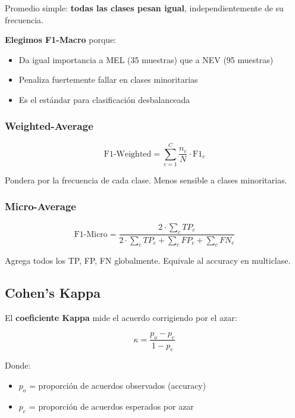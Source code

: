 \documentclass[12pt,a4paper]{article}
\begin{document}
Promedio simple: \textbf{todas las clases pesan igual}, independientemente de su frecuencia.

\textbf{Elegimos F1-Macro} porque:
\begin{itemize}
    \item Da igual importancia a MEL (35 muestras) que a NEV (95 muestras)
    \item Penaliza fuertemente fallar en clases minoritarias
    \item Es el estándar para clasificación desbalanceada
\end{itemize}

\subsubsection{Weighted-Average}

\begin{equation}
\text{F1-Weighted} = \sum_{c=1}^{C} \frac{n_c}{N} \cdot \text{F1}_c
\end{equation}

Pondera por la frecuencia de cada clase. Menos sensible a clases minoritarias.

\subsubsection{Micro-Average}

\begin{equation}
\text{F1-Micro} = \frac{2 \cdot \sum_c TP_c}{2 \cdot \sum_c TP_c + \sum_c FP_c + \sum_c FN_c}
\end{equation}

Agrega todos los TP, FP, FN globalmente. Equivale al accuracy en multiclase.

\subsection{Cohen's Kappa}

El \textbf{coeficiente Kappa} mide el acuerdo corrigiendo por el azar:

\begin{equation}
\kappa = \frac{p_o - p_e}{1 - p_e}
\end{equation}

Donde:
\begin{itemize}
    \item $p_o$ = proporción de acuerdos observados (accuracy)
    \item $p_e$ = proporción de acuerdos esperados por azar
\end{itemize}
\end{document}

